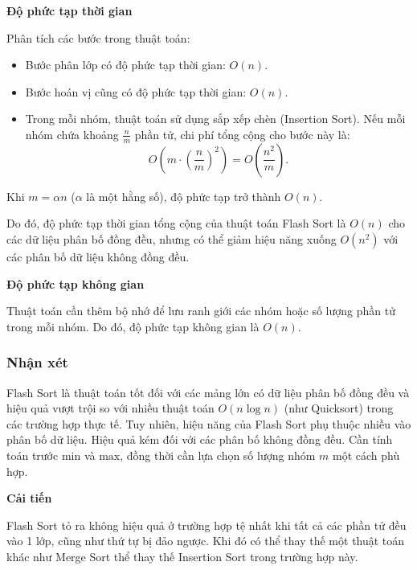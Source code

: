 \textbf{Độ phức tạp thời gian}

Phân tích các bước trong thuật toán:
\begin{itemize}
    \item Bước phân lớp có độ phức tạp thời gian: \( O(n) \).
\item Bước hoán vị cũng có độ phức tạp thời gian: \( O(n) \).
\item Trong mỗi nhóm, thuật toán sử dụng sắp xếp chèn (Insertion Sort). Nếu mỗi nhóm chứa khoảng \( \frac{n}{m} \) phần tử, chi phí tổng cộng cho bước này là:
\[
O\left( m \cdot \left(\frac{n}{m}\right)^2 \right) = O\left(\frac{n^2}{m}\right).
\]
\end{itemize}

Khi \( m = \alpha n \) (\( \alpha \) là một hằng số), độ phức tạp trở thành \( O(n) \).

Do đó, độ phức tạp thời gian tổng cộng của thuật toán Flash Sort là \( O(n) \) cho các dữ liệu phân bố đồng đều, nhưng có thể giảm hiệu năng xuống \( O(n^2) \) với các phân bố dữ liệu không đồng đều.

\textbf{Độ phức tạp không gian}

Thuật toán cần thêm bộ nhớ để lưu ranh giới các nhóm hoặc số lượng phần tử trong mỗi nhóm. Do đó, độ phức tạp không gian là \( O(n) \).

\subsubsection{Nhận xét}
Flash Sort là thuật toán tốt đối với các mảng lớn có dữ liệu phân bố đồng đều và hiệu quả vượt trội so với nhiều thuật toán \( O(n \log n) \) (như Quicksort) trong các trường hợp thực tế. Tuy nhiên, hiệu năng của Flash Sort phụ thuộc nhiều vào phân bố dữ liệu. Hiệu quả kém đối với các phân bố không đồng đều. Cần tính toán trước \( \text{min} \) và \( \text{max} \), đồng thời cần lựa chọn số lượng nhóm \( m \) một cách phù hợp.


\textbf{Cải tiến} 

Flash Sort tỏ ra không hiệu quả ở trường hợp tệ nhất khi tất cả các phần tử đều vào 1 lớp, cũng như thứ tự bị đảo ngược. Khi đó có thể thay thế một thuật toán khác như Merge Sort thể thay thế Insertion Sort trong trường hợp này.